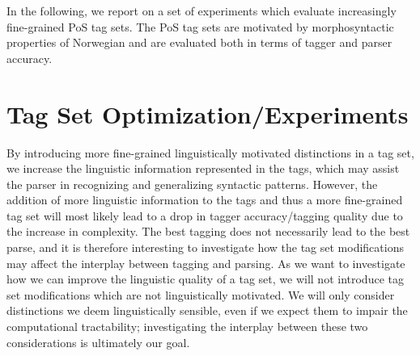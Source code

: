 \documentclass[11pt,a4paper]{article}
\begin{document}
In the following, we report on a set of experiments which evaluate
increasingly fine-grained PoS tag sets. The PoS tag sets are motivated
by morphosyntactic properties of Norwegian and are evaluated both in
terms of tagger and parser accuracy.

\section{Tag Set Optimization/Experiments}
\label{sec:optimization}
By introducing more fine-grained linguistically motivated distinctions in a tag
set, we increase the linguistic information represented in the tags, which may
assist the parser in recognizing and generalizing syntactic patterns. However,
the addition of more linguistic information to the tags and thus a more
fine-grained tag set will most likely lead to a drop in tagger accuracy/tagging
quality due to the increase in complexity. The best tagging does not
necessarily lead to the best parse, and it is therefore interesting to
investigate how the tag set modifications may affect the interplay between
tagging and parsing. As we want to investigate how we can improve the
linguistic quality of a tag set, we will not introduce tag set modifications
which are not linguistically motivated. We will only consider distinctions we
deem linguistically sensible, even if we expect them to impair the
computational tractability; investigating the interplay between these two
considerations is ultimately our goal.
\end{document}
